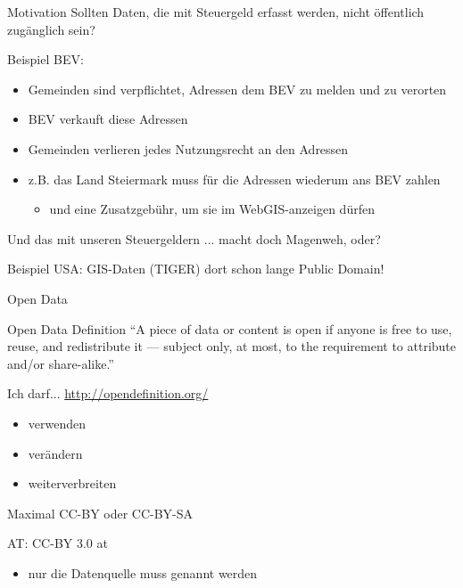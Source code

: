 \documentclass{beamer}
\begin{document}
\begin{frame}{Motivation}
	Sollten Daten, die mit Steuergeld erfasst werden, nicht öffentlich zugänglich sein?

	\vspace{3mm}
	Beispiel BEV:
	\begin{itemize}
		\item Gemeinden sind verpflichtet, Adressen dem BEV zu melden und zu verorten
		\item BEV verkauft diese Adressen
		\item Gemeinden verlieren jedes Nutzungsrecht an den Adressen
		\item z.B. das Land Steiermark muss für die Adressen wiederum ans BEV zahlen
			\pause
		\begin{itemize}
			\item und eine Zusatzgebühr, um sie im WebGIS-anzeigen dürfen
		\end{itemize}
	\end{itemize}

	 Und das mit unseren Steuergeldern ... macht doch Magenweh, oder?

	 \vspace{3mm}
	 Beispiel USA: GIS-Daten (TIGER) dort schon lange Public Domain!
\end{frame}

\begin{frame}{Open Data}
	\begin{block}{Open Data Definition} 
	“A piece of data or content is open if anyone is free to use, reuse, and redistribute it — subject only, at most, to the requirement to attribute and/or share-alike.”
\end{block}


Ich darf... \hfill \url{http://opendefinition.org/}
	\begin{itemize}
		\item verwenden
		\item verändern
		\item weiterverbreiten
	\end{itemize}
	
	Maximal CC-BY oder CC-BY-SA

	\pause
	\vspace{3mm}
AT: CC-BY 3.0 at
\begin{itemize}
		                \item nur die Datenquelle muss genannt werden
			\end{itemize}
\end{frame}
\end{document}
